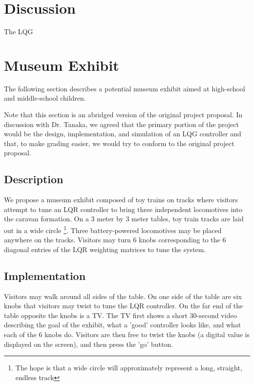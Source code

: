 \documentclass[12pt,onecolumn,reqno]{amsart}
\begin{document}
\section{Discussion}
The LQG 


\section{Museum Exhibit}
The following section describes a potential museum exhibit aimed at high-school
and middle-school children.

Note that this section is an abridged version of the original project proposal.
In discussion with Dr. Tanaka, we agreed that the primary portion of the project
would be the design, implementation, and simulation of an LQG controller and
that, to make grading easier, we would try to conform to the original project
proposal.

\subsection{Description}
We propose a museum exhibit composed of toy trains on tracks where visitors
attempt to tune an LQR controller to bring three independent locomotives into
the caravan formation. On a 3 meter by 3 meter tables, toy train tracks are laid
out in a wide circle \footnote {The hope is that a wide circle will
approximately represent a long, straight, endless track}. Three battery-powered
locomotives may be placed anywhere on the tracks. Visitors may turn 6 knobs
corresponding to the 6 diagonal entries of the LQR weighting matrices to tune
the system.


\subsection{Implementation}
Visitors may walk around all sides of the table. On one side of the table are
six knobs that visitors may twist to tune the LQR controller. On the far end of
the table opposite the knobs is a TV. The TV first shows a short 30-second video
describing the goal of the exhibit, what a 'good' controller looks like, and
what each of the 6 knobs do. Visitors are then free to twist the knobs (a
digital value is displayed on the screen), and then press the 'go' button.
\end{document}
